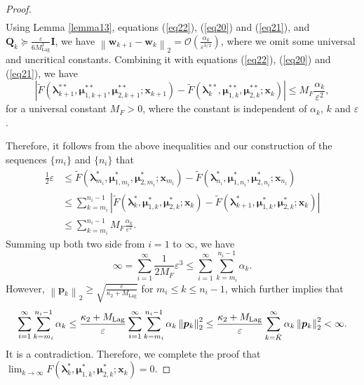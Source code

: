 \documentclass[aos]{imsart}
\numberwithin{equation}{section}
\theoremstyle{plain}
\begin{document}
\begin{appendix}
\begin{proof}
\begin{equation*}
\begin{split}
        \end{split}
    \end{equation*}
    Using Lemma \ref{lemma13}, equations (\ref{eq22}), (\ref{eq20}) and (\ref{eq21}), and $\bm{Q}_{k} \succeq \frac{\varepsilon}{ 6 M_{\text{Lag}}^2} \bm{I}$, we have $\left\| \bm{w}_{k+1} - \bm{w}_{k} \right\|_2 = \mathcal{O}\left( \frac{\alpha_k}{\varepsilon^{3/2}} \right)$, where we omit some universal and uncritical constants. Combining it with equations (\ref{eq22}), (\ref{eq20}) and (\ref{eq21}), we have 
    \begin{equation*}
        \left|  \widetilde{F}(\bm{\lambda}_{k+1}^{**}, \bm{\mu}_{1,k+1}^{**}, \bm{\mu}_{2,k+1}^{**}; \bm{x}_{k+1}) -  \widetilde{F}(\bm{\lambda}_{k}^{**}, \bm{\mu}_{1,k}^{**}, \bm{\mu}_{2,k}^{**}; \bm{x}_{k}) \right| \leq M_{F} \frac{\alpha_k}{\varepsilon^2},
    \end{equation*}
    for a universal constant $M_{F}>0$, where the constant is independent of $\alpha_k$, $k$ and $\varepsilon$.
    
    
    Therefore, it follows from the above inequalities and our construction of the sequences $\{m_i\}$ and $\{n_i\}$ that
    \begin{equation}
        \begin{split}
            \frac{1}{2} \varepsilon & \leq \widetilde{F}(\bm{\lambda}_{m_i}^{*}, \bm{\mu}_{1,m_i}^{*}, \bm{\mu}_{2,m_i}^{*}; \bm{x}_{m_i}) - \widetilde{F}(\bm{\lambda}_{n_i}^{*}, \bm{\mu}_{1,n_i}^{*}, \bm{\mu}_{2,n_i}^{*}; \bm{x}_{n_i}) \\
            & \leq \sum_{k=m_i}^{n_i -1} \left |\widetilde{F}(\bm{\lambda}_{k}^{*}, \bm{\mu}_{1,k}^{*}, \bm{\mu}_{2,k}^{*}; \bm{x}_{k}) - \widetilde{F}(\bm{\lambda}_{k+1}^{*}, \bm{\mu}_{1,k}^{*}, \bm{\mu}_{2,k}^{*}; \bm{x}_{k}) \right| \\
            & \leq \sum_{k=m_i}^{n_i -1} M_{F}  \frac{\alpha_k}{ \varepsilon^2}.
        \end{split}
    \end{equation}
    Summing up both two side from $i=1$ to $\infty$, we have 
    \begin{equation*}
         \infty = \sum_{i=1}^{\infty} \frac{1}{2 M_{F}} \varepsilon^3 \leq  \sum_{i=1}^{\infty} \sum_{k=m_i}^{n_i -1} \alpha_k.
    \end{equation*}
    However, $\left\| \bm{p}_{k} \right\|_2 \geq \sqrt{\frac{\varepsilon}{\kappa_2 + M_{\text{Lag}} }}$ for $m_i \leq k \leq n_i-1$, which further implies that 
    \begin{equation*}
         \sum_{i=1}^{\infty} \sum_{k=m_i}^{n_i -1}  \alpha_k  \leq \frac{ \kappa_2 + M_{\text{Lag}} }{\varepsilon } \sum_{i=1}^{\infty} \sum_{k=m_i}^{n_i -1} \alpha_k  \left\| \bm{p}_{k} \right\|_2^2 \leq \frac{ \kappa_2 + M_{\text{Lag}} }{\varepsilon } \sum_{k=\Bar{K}}^{\infty} \alpha_k  \left\| \bm{p}_{k} \right\|_2^2 < \infty.
    \end{equation*}
    It is a contradiction. Therefore, we complete the proof that $\lim_{k \to \infty} F(\bm{\lambda}_{k}^{*}, \bm{\mu}_{1,k}^{*}, \bm{\mu}_{2,k}^{*}; \bm{x}_k) = 0$.
\end{proof}




\end{appendix}
\end{document}
